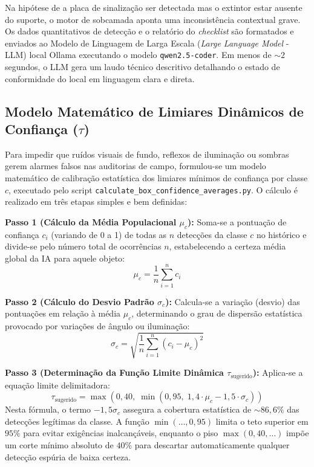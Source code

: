 \documentclass[a4paper,11pt]{article}
\begin{document}
Na hipótese de a placa de sinalização ser detectada mas o extintor estar ausente do suporte, o motor de sobcamada aponta uma inconsistência contextual grave. Os dados quantitativos de detecção e o relatório do \textit{checklist} são formatados e enviados ao Modelo de Linguagem de Larga Escala (\textit{Large Language Model} - LLM) local Ollama executando o modelo \texttt{qwen2.5-coder}. Em menos de $\sim 2$ segundos, o LLM gera um laudo técnico descritivo detalhando o estado de conformidade do local em linguagem clara e direta.

\subsection*{Modelo Matemático de Limiares Dinâmicos de Confiança ($\tau$)}
Para impedir que ruídos visuais de fundo, reflexos de iluminação ou sombras gerem alarmes falsos nas auditorias de campo, formulou-se um modelo matemático de calibração estatística dos limiares mínimos de confiança por classe $c$, executado pelo script \texttt{calculate\_box\_confidence\_averages.py}. O cálculo é realizado em três etapas simples e bem definidas:

\textbf{Passo 1 (Cálculo da Média Populacional $\mu_c$):} Soma-se a pontuação de confiança $c_i$ (variando de 0 a 1) de todas as $n$ detecções da classe $c$ no histórico e divide-se pelo número total de ocorrências $n$, estabelecendo a certeza média global da IA para aquele objeto:
\begin{equation} \label{eq:media}
\mu_c = \frac{1}{n} \sum_{i=1}^{n} c_i
\end{equation}

\textbf{Passo 2 (Cálculo do Desvio Padrão $\sigma_c$):} Calcula-se a variação (desvio) das pontuações em relação à média $\mu_c$, determinando o grau de dispersão estatística provocado por variações de ângulo ou iluminação:
\begin{equation} \label{eq:desvio}
\sigma_c = \sqrt{\frac{1}{n} \sum_{i=1}^{n} (c_i - \mu_c)^2}
\end{equation}

\textbf{Passo 3 (Determinação da Função Limite Dinâmica $\tau_{\text{sugerido}}$):} Aplica-se a equação limite delimitadora:
\begin{equation} \label{eq:limiar_dinamico}
\tau_{\text{sugerido}} = \max\left(0{,}40, \; \min\left(0{,}95, \; 1{,}4 \cdot \mu_c - 1{,}5 \cdot \sigma_c\right)\right)
\end{equation}
Nesta fórmula, o termo $-1{,}5\sigma_c$ assegura a cobertura estatística de $\sim 86{,}6\%$ das detecções legítimas da classe. A função $\min(\dots, 0{,}95)$ limita o teto superior em $95\%$ para evitar exigências inalcançáveis, enquanto o piso $\max(0{,}40, \dots)$ impõe um corte mínimo absoluto de $40\%$ para descartar automaticamente qualquer detecção espúria de baixa certeza.
\end{document}
